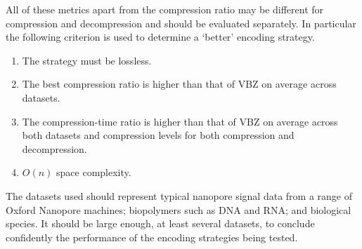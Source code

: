 All of these metrics apart from the compression ratio may be different for compression and decompression and should be evaluated separately. In particular the following criterion is used to determine a `better' encoding strategy.
\begin{enumerate}
\item The strategy must be lossless.
\item The best compression ratio is higher than that of VBZ on average across datasets.
\item The compression-time ratio is higher than that of VBZ on average across both datasets and compression levels for both compression and decompression.
\item $O(n)$ space complexity.
\end{enumerate}

The datasets used should represent typical nanopore signal data from a range of Oxford Nanopore machines; biopolymers such as DNA and RNA; and biological species. It should be large enough, at least several datasets, to conclude confidently the performance of the encoding strategies being tested.
